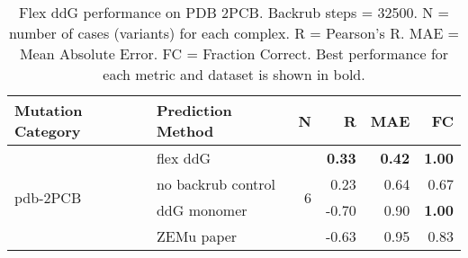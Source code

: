 \begin{table}
  \begin{tabular}{llrrrr}
\toprule
Mutation Category &   Prediction Method &  N &     R &  MAE &   FC \\
\midrule
 \multirow{ 4}{*}{pdb-2PCB} & flex ddG & \multirow{ 4}{*}{6} & \textbf{0.33} & \textbf{0.42} & \textbf{1.00}  \\
 & no backrub control & & 0.23 & 0.64 & 0.67  \\
 & ddG monomer & & -0.70 & 0.90 & \textbf{1.00}  \\
 & ZEMu paper & & -0.63 & 0.95 & 0.83  \\
\bottomrule
\end{tabular}
  \caption[Flex ddG performance on PDB 2PCB]{
    Flex ddG performance on PDB 2PCB. Backrub steps = 32500. N = number of cases (variants) for each complex. R = Pearson's R. MAE = Mean Absolute Error. FC = Fraction Correct. Best performance for each metric and dataset is shown in bold.
  } \label{tab:table-pdb-2PCB}
\end{table}
